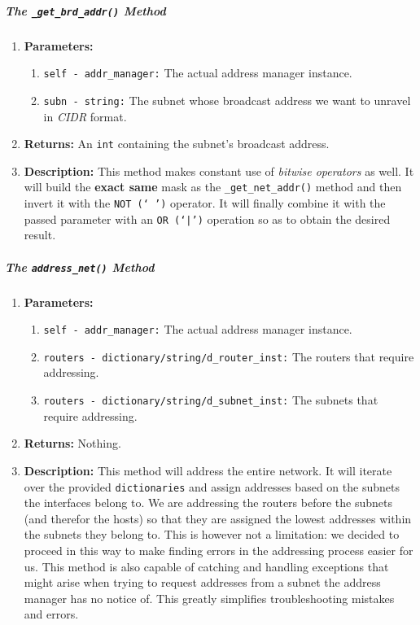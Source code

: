         \subparagraph{The \texttt{\_get\_brd\_addr()} Method}
            \begin{enumerate}
                \item \textbf{Parameters:}
                \begin{enumerate}
                    \item \texttt{self - addr\_manager:} The actual address manager instance.
                    \item \texttt{subn - string:} The subnet whose broadcast address we want to unravel in \textit{CIDR} format.
                \end{enumerate}
                \item \textbf{Returns:} An \texttt{int} containing the subnet's broadcast address.
                \item \textbf{Description:} This method makes constant use of \textit{bitwise operators} as well. It will build the \textbf{exact same} mask as the \texttt{\_get\_net\_addr()} method and then invert it with the \texttt{NOT (`~')} operator. It will finally combine it with the passed parameter with an \texttt{OR (`|')} operation so as to obtain the desired result.
            \end{enumerate}

        \subparagraph{The \texttt{address\_net()} Method}
            \begin{enumerate}
                \item \textbf{Parameters:}
                \begin{enumerate}
                    \item \texttt{self - addr\_manager:} The actual address manager instance.
                    \item \texttt{routers - dictionary/string/d\_router\_inst:} The routers that require addressing.
                    \item \texttt{routers - dictionary/string/d\_subnet\_inst:} The subnets that require addressing.
                \end{enumerate}
                \item \textbf{Returns:} Nothing.
                \item \textbf{Description:} This method will address the entire network. It will iterate over the provided \texttt{dictionaries} and assign addresses based on the subnets the interfaces belong to. We are addressing the routers before the subnets (and therefor the hosts) so that they are assigned the lowest addresses within the subnets they belong to. This is however not a limitation: we decided to proceed in this way to make finding errors in the addressing process easier for us. This method is also capable of catching and handling exceptions that might arise when trying to request addresses from a subnet the address manager has no notice of. This greatly simplifies troubleshooting mistakes and errors.
            \end{enumerate}

